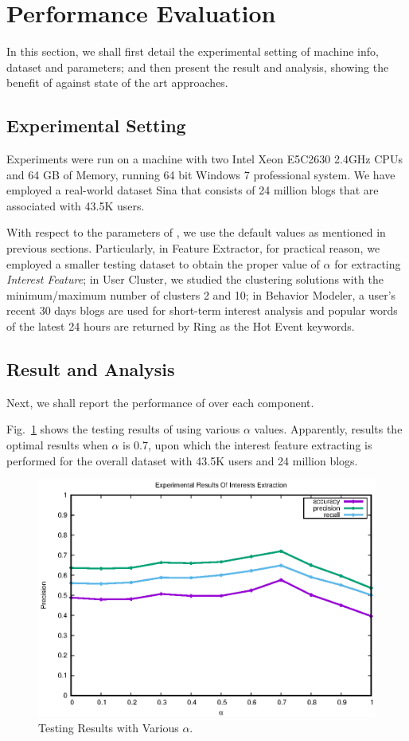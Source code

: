 \section{Performance Evaluation}
\label{sec:perf}

In this section, we shall first detail the experimental setting of machine info, dataset and parameters; and then present the result and analysis, showing the benefit of \sys{} against state of the art approaches.

\subsection{Experimental Setting}

Experiments were run on a machine with two Intel Xeon E5C2630 2.4GHz CPUs and 64 GB of Memory, running 64 bit Windows 7 professional system.
%
We have employed a real-world dataset Sina that consists of 24 million blogs that are associated with 43.5K users.

With respect to the parameters of \sys{}, we use the default values as mentioned in previous sections.
Particularly, in Feature Extractor, for practical reason, we employed a smaller testing dataset to obtain the proper value of $\alpha$ for extracting \textit{Interest Feature};
in User Cluster, we studied the clustering solutions with the minimum/maximum number of clusters 2 and 10;
in Behavior Modeler, a user's recent 30 days blogs are used for short-term interest analysis and popular words of the latest 24 hours are returned by Ring as the Hot Event keywords.

\subsection{Result and Analysis}
Next, we shall report the performance of \sys{} over each component.

%
Fig.\ \ref{fig:fe} shows the testing results of using various $\alpha$ values.
Apparently, \sys{} results the optimal results when $\alpha$ is 0.7, upon which the interest feature extracting is performed for the overall dataset with 43.5K users and 24 million blogs.

\begin{figure}[!htb]
\centering
\includegraphics[width=.7\linewidth]{figures/Interests}
\caption{Testing Results with Various $\alpha$.}
\label{fig:fe}
\end{figure}


